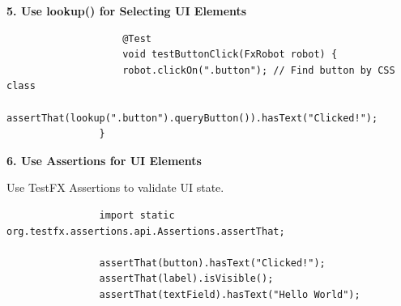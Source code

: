 \documentclass[a4paper]{report}
\begin{document}
\textbf{5. Use lookup() for Selecting UI Elements}

\begin{lstlisting}
                    @Test
                    void testButtonClick(FxRobot robot) {
                    robot.clickOn(".button"); // Find button by CSS class
                    assertThat(lookup(".button").queryButton()).hasText("Clicked!");
                }
\end{lstlisting}

\textbf{6. Use Assertions for UI Elements}

Use TestFX Assertions to validate UI state.

\begin{lstlisting}
                import static org.testfx.assertions.api.Assertions.assertThat;
            
                assertThat(button).hasText("Clicked!");
                assertThat(label).isVisible();
                assertThat(textField).hasText("Hello World");
\end{lstlisting}    
\end{document}
